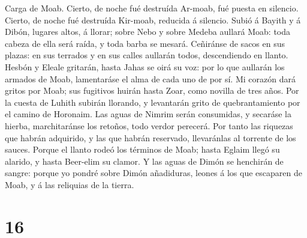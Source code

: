  Carga de Moab. Cierto, de noche fué destruída Ar-moab, fué
puesta en silencio. Cierto, de noche fué destruída Kir-moab, reducida á
silencio.  Subió á Bayith y á Dibón, lugares altos, á
llorar; sobre Nebo y sobre Medeba aullará Moab: toda cabeza de ella será
raída, y toda barba se mesará.  Ceñiránse de sacos en sus
plazas: en sus terrados y en sus calles aullarán todos, descendiendo en
llanto.  Hesbón y Eleale gritarán, hasta Jahas se oirá su
voz: por lo que aullarán los armados de Moab, lamentaráse el alma de
cada uno de por sí.  Mi corazón dará gritos por Moab; sus
fugitivos huirán hasta Zoar, como novilla de tres años. Por la cuesta de
Luhith subirán llorando, y levantarán grito de quebrantamiento por el
camino de Horonaim.  Las aguas de Nimrim serán consumidas, y
secaráse la hierba, marchitaránse los retoños, todo verdor perecerá.
 Por tanto las riquezas que habrán adquirido, y las que
habrán reservado, llevaránlas al torrente de los sauces. 
Porque el llanto rodeó los términos de Moab; hasta Eglaim llegó su
alarido, y hasta Beer-elim su clamor.  Y las aguas de Dimón
se henchirán de sangre: porque yo pondré sobre Dimón añadiduras, leones
á los que escaparen de Moab, y á las reliquias de la tierra.

\hypertarget{section-15}{%
\section{16}\label{section-15}}

